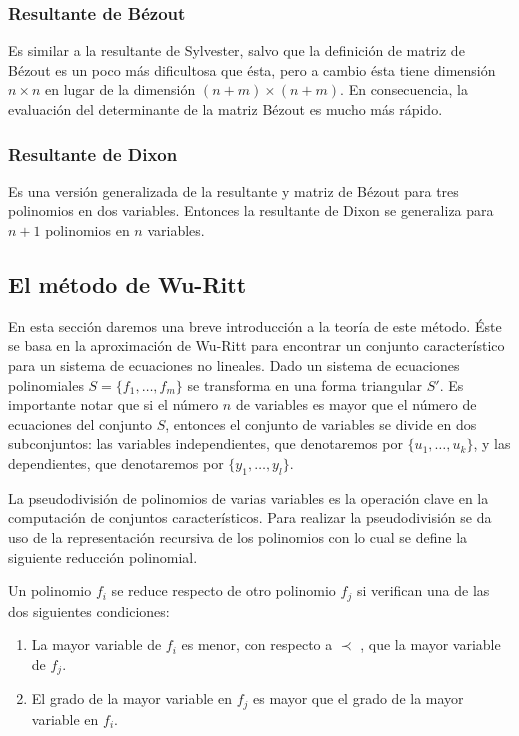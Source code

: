 \subsubsection*{Resultante de Bézout}

Es similar a la resultante de Sylvester, salvo que la definición de matriz de Bézout es un poco más dificultosa que ésta, pero a cambio ésta tiene dimensión $n \times n$ en lugar de la dimensión $(n+m) \times (n+m)$. En consecuencia, la evaluación del determinante de la matriz Bézout es mucho más rápido.

\subsubsection*{Resultante de Dixon}

Es una versión generalizada de la resultante y matriz de Bézout para tres polinomios en dos variables. Entonces la resultante de Dixon se generaliza para $n+1$ polinomios en $n$ variables.

\subsection{El método de Wu-Ritt}

En esta sección daremos una breve introducción a la teoría de este método. Éste se basa en la aproximación de Wu-Ritt para encontrar un conjunto característico para un sistema de ecuaciones no lineales. Dado un sistema de ecuaciones polinomiales $S = \{ f_1, \dotso, f_m \}$ se transforma en una forma triangular $S'$. Es importante notar que si el número $n$ de variables es mayor que el número de ecuaciones del conjunto $S$, entonces el conjunto de variables se divide en dos subconjuntos: las variables independientes, que denotaremos por $\{ u_1, \dotso, u_k \}$, y las dependientes, que denotaremos por $\{ y_1, \dotso, y_l \}$.

La pseudodivisión de polinomios de varias variables es la operación clave en la computación de conjuntos característicos. Para realizar la pseudodivisión se da uso de la representación recursiva de los polinomios con lo cual se define la siguiente reducción polinomial.

Un polinomio $f_i$ se reduce respecto de otro polinomio $f_j$ si verifican una de las dos siguientes condiciones:
\begin{enumerate}
\item La mayor variable de $f_i$ es menor, con respecto a $\prec$ , que la mayor variable de $f_j$.
\item El grado de la mayor variable en $f_j$ es mayor que el grado de la mayor variable en $f_i$.
\end{enumerate} 

